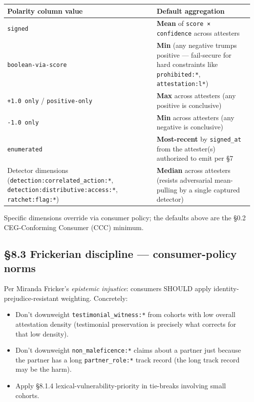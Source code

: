 \documentclass[10pt]{article}
\begin{document}
{\footnotesize
\begin{longtable}{|p{8.0cm}|p{8.0cm}|}\hline
\textbf{Polarity column value} & \textbf{Default aggregation} \\ \hline\endhead
\texttt{signed} & \textbf{Mean} of \texttt{score × confidence} across attesters \\ \hline
\texttt{boolean-via-score} & \textbf{Min} (any negative trumps positive — fail-secure for hard constraints like \texttt{prohibited:*}, \texttt{attestation:l*}) \\ \hline
\texttt{+1.0 only} / \texttt{positive-only} & \textbf{Max} across attesters (any positive is conclusive) \\ \hline
\texttt{-1.0 only} & \textbf{Min} across attesters (any negative is conclusive) \\ \hline
\texttt{enumerated} & \textbf{Most-recent} by \texttt{signed\_at} from the attester(s) authorized to emit per §7 \\ \hline
Detector dimensions (\texttt{detection:correlated\_action:*}, \texttt{detection:distributive:access:*}, \texttt{ratchet:flag:*}) & \textbf{Median} across attesters (resists adversarial mean-pulling by a single captured detector) \\ \hline
\end{longtable}}


Specific dimensions override via consumer policy; the defaults above are the §0.2 CEG-Conforming Consumer (CCC) minimum.


\subsection*{§8.3 Frickerian discipline — consumer-policy norms}


Per Miranda Fricker's \textit{epistemic injustice}: consumers SHOULD apply identity-prejudice-resistant weighting. Concretely:


\begin{itemize}\setlength\itemsep{0pt}
\item Don't downweight \texttt{testimonial\_witness:*} from cohorts with low overall attestation density (testimonial preservation is precisely what corrects for that low density).
\item Don't downweight \texttt{non\_maleficence:*} claims about a partner just because the partner has a long \texttt{partner\_role:*} track record (the long track record may be the harm).
\item Apply §8.1.4 lexical-vulnerability-priority in tie-breaks involving small cohorts.
\end{itemize}
\end{document}
